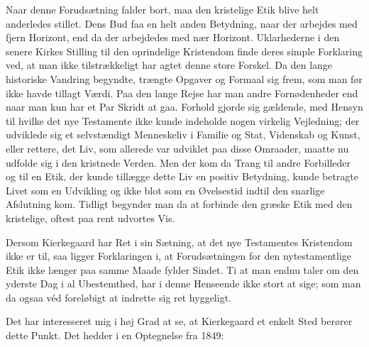 \documentclass[12pt,a4paper,openany]{book}
\newcommand{\opage}[1]{\marginnote{\footnotesize\textit{[#1]}}}
\begin{document}
Naar denne Forudsætning falder bort, maa den kristelige
Etik blive helt anderledes stillet. Dens Bud faa en helt
anden Betydning, naar der arbejdes med fjern Horizont, end
da der arbejdedes med nær Horizont. Uklarhederne i den
senere Kirkes Stilling til den oprindelige Kristendom finde
deres simple Forklaring ved, at man ikke tilstrækkeligt
har agtet denne store Forskel. Da den lange historiske
Vandring begyndte, trængte Opgaver og Formaal sig frem,
\opage{153}som man før ikke havde tillagt Værdi. Paa den lange
Rejse har man andre Fornødenheder end naar man kun
har et Par Skridt at gaa. Forhold gjorde sig gældende,
med Hensyn til hvilke det nye Testamente ikke kunde
indeholde nogen virkelig Vejledning; der udviklede sig
et selvstændigt Menneskeliv i Familie og Stat, Videnskab
og Kunst, eller rettere, det Liv, som allerede var udviklet
paa disse Omraader, maatte nu udfolde sig i den kristnede
Verden. Men der kom da Trang til andre Forbilleder
og til en Etik, der kunde tillægge dette Liv en
positiv Betydning, kunde betragte Livet som en Udvikling
og ikke blot som en Øvelsestid indtil den snarlige
Afslutning kom. Tidligt begynder man da at forbinde
den græske Etik med den kristelige, oftest paa rent udvortes
Vis.

Dersom Kierkegaard har Ret i sin Sætning, at det
nye Testamentes Kristendom ikke er til, saa ligger Forklaringen
i, at Forudsætningen for den nytestamentlige
Etik ikke længer paa samme Maade fylder Sindet. Ti
at man endnu taler om den yderste Dag i al Ubestemthed,
har i denne Henseende ikke stort at sige; som man
da ogsaa véd foreløbigt at indrette sig ret hyggeligt.

Det har interesseret mig i høj Grad at se, at Kierkegaard
et enkelt Sted berører dette Punkt. Det hedder i
en Optegnelse fra 1849:
\end{document}
